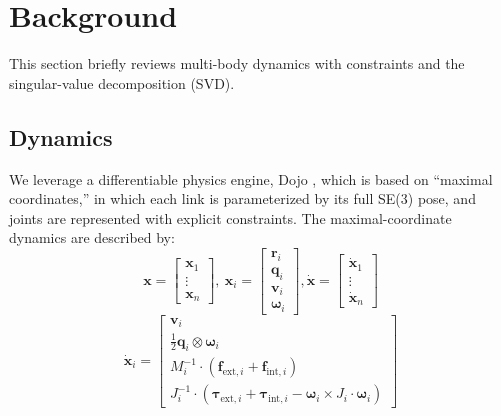 \section{Background} \label{background}
This section briefly reviews multi-body dynamics with constraints and the singular-value decomposition (SVD).

\subsection{Dynamics} We leverage a differentiable physics engine, Dojo \cite{howell_dojo_2022}, which is based on “maximal coordinates,” in which each link is parameterized by its full SE(3) pose, and joints are represented with explicit constraints. The maximal-coordinate dynamics are described by:
\begin{equation}
\textbf{x} = \begin{bmatrix}
    \textbf{x}_1 \\
    \vdots \\
    \textbf{x}_n
\end{bmatrix}, \ \textbf{x}_i = \begin{bmatrix}
    \textbf{r}_i \\ \textbf{q}_i \\ \textbf{v}_i \\ \boldsymbol{\omega}_i
\end{bmatrix},    \dot{\textbf{x}} = \begin{bmatrix}
    \dot{\textbf{x}}_1 \\ 
    \vdots \\ 
    \dot{\textbf{x}}_n
\end{bmatrix}
\end{equation}
\begin{equation}
    \dot{\textbf{x}}_i = \begin{bmatrix}
    {\textbf{v}}_i \\ \frac{1}{2}\textbf{q}_i \otimes \boldsymbol{\omega}_i \\ M_i^{-1} \cdot (\textbf{f}_{\text{ext}, i} + \textbf{f}_{\text{int}, i}) \\ J_i^{-1} \cdot (\boldsymbol{\tau}_{\text{ext}, i} + \boldsymbol{\tau}_{\text{int}, i} - \boldsymbol{\omega}_i \times J_i \cdot \boldsymbol{\omega}_i)
\end{bmatrix}  
\end{equation}
